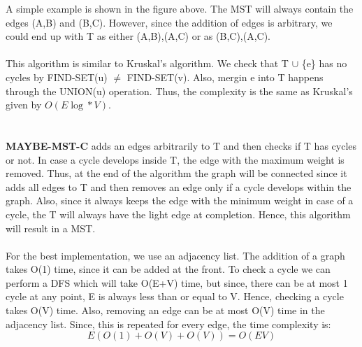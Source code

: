 \documentclass[10pt]{article}
\begin{document}
A simple example is shown in the figure above. The MST will always contain the edges (A,B) and (B,C). However, since the addition of edges is arbitrary, we could end up with T as either (A,B),(A,C) or as (B,C),(A,C).\\\\
This algorithm is similar to Kruskal's algorithm. We check that T $\cup$ \{e\} has no cycles by FIND-SET(u) $\neq$ FIND-SET(v). Also, mergin e into T happens through the UNION(u) operation. Thus, the complexity is the same as Kruskal's given by $O(E\log \ast V)$.\\\\\\
\textbf{MAYBE-MST-C} adds an edges arbitrarily to T and then checks if T has cycles or not. In case a cycle develops inside T, the edge with the maximum weight is removed. Thus, at the end of the algorithm the graph will be connected since it adds all edges to T and then removes an edge only if a cycle develops within the graph. Also, since it always keeps the edge with the minimum weight in case of a cycle, the T will always have the light edge at completion. Hence, this algorithm will result in a MST.\\\\
For the best implementation, we use an adjacency list. The addition of a graph takes O(1) time, since it can be added at the front. To check a cycle we can perform a DFS which will take O(E+V) time, but since, there can be at most 1 cycle at any point, E is always less than or equal to V. Hence, checking a cycle takes O(V) time. Also, removing an edge can be at most O(V) time in the adjacency list. Since, this is repeated for every edge, the time complexity is: $$E(O(1) + O(V) + O(V)) = O(EV)$$
\newpage
\end{document}
